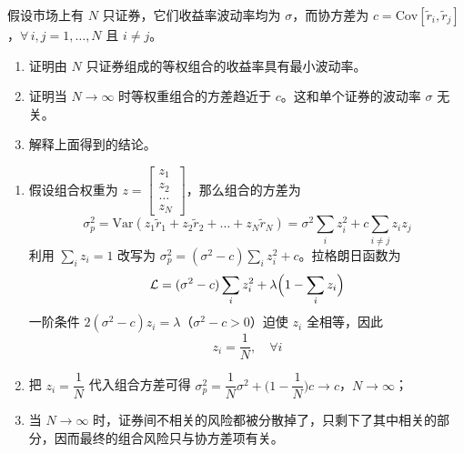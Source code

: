 \begin{problem}
 假设市场上有 $N$ 只证券，它们收益率波动率均为 $\sigma$，而协方差为 $c=\mathrm{Cov}[\tilde{r}_{i},\tilde{r}_{j}]$，$\forall\, i,j=1,\dots,N$ 且 $i\ne j$。
\begin{enumerate}[label=(\alph*)]
    \item 证明由 $N$ 只证券组成的等权组合的收益率具有最小波动率。
    \item 证明当 $N\to\infty$ 时等权重组合的方差趋近于 $c$。这和单个证券的波动率 $\sigma$ 无关。
    \item 解释上面得到的结论。
\end{enumerate}
\end{problem}
\begin{solution}
\begin{enumerate}[label=(\alph*)]
    \item 假设组合权重为 $z=\begin{bmatrix}z_{1} \\ z_{2} \\ \dots \\ z_{N}\end{bmatrix}$，那么组合的方差为
    \[
        \sigma_{p}^{2}=\mathrm{Var}(z_{1}\tilde{r}_{1}+z_{2}\tilde{r}_{2}+\dots+z_{N}\tilde{r}_{N})=\sigma^{2}\sum_{i}z_{i}^{2}+c\sum_{i\ne j}z_{i}z_{j}
    \]
    利用 $\sum_{i}z_{i}=1$ 改写为 $\sigma_{p}^{2}=(\sigma^{2}-c)\sum_{i}z_{i}^{2}+c$。拉格朗日函数为
    \[
        \mathcal{L}=(\sigma^{2}-c)\sum_{i}z_{i}^{2}+\lambda\Bigl(1-\sum_{i}z_{i}\Bigr)
    \]
    一阶条件 $2(\sigma^{2}-c)z_{i}=\lambda$（$\sigma^{2}-c>0$）迫使 $z_{i}$ 全相等，因此
    \[
        z_{i}=\frac{1}{N},\quad\forall i
    \]
    \item 把 $z_{i}=\dfrac{1}{N}$ 代入组合方差可得 $\sigma_{p}^{2}=\dfrac{1}{N}\sigma^{2}+\bigl(1-\dfrac{1}{N}\bigr)c\to c$，$N\to\infty$；
    \item 当 $N\to\infty$ 时，证券间不相关的风险都被分散掉了，只剩下了其中相关的部分，因而最终的组合风险只与协方差项有关。
\end{enumerate}
\end{solution}

